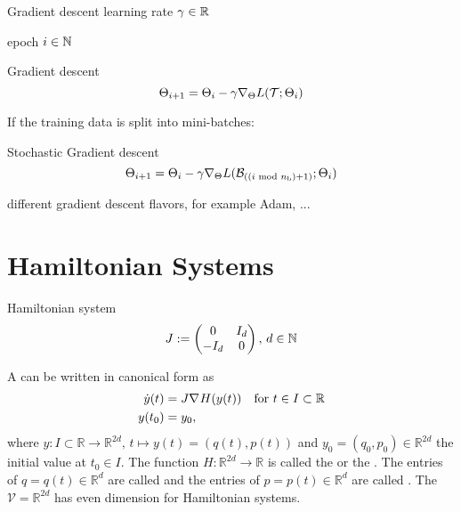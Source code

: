 \begin{frame}{Gradient descent}
  learning rate $\gamma \in  \R$

  epoch $i \in \N$
  \begin{block}{Gradient descent}
    \begin{equation*}
      \Theta_{i+1} = \Theta_i - \gamma \grad[\Theta]{L(\mathcal{T};\Theta_{i})}
    \end{equation*}
  \end{block}

  If the training data is split into mini-batches:
  \begin{block}{Stochastic Gradient descent}
    \begin{equation*}
      \Theta_{i+1} = \Theta_i - \gamma \grad[\Theta]{L(
        \mathcal{B}_{((i \textrm{ mod } n_{\text{b}}) + 1)};
        \Theta_{i})}
    \end{equation*}
  \end{block}

  different gradient descent flavors, for example Adam, ...
\end{frame}

\section{Hamiltonian Systems}

\begin{frame}{Hamiltonian system}
  \begin{equation*}
    J := \begin{pmatrix}
      0 & I_d \\
      -I_d & 0
    \end{pmatrix}, \,
    d \in \N
  \end{equation*}

  \begin{definition}
    A  can be written in canonical form as
    \begin{align*}
      \dot{y}(t) &= J \grad{H}(y(t)) \quad \text{for } t \in I \subset \mathbb{R} \\
      y(t_0) &= y_0
      ,
    \end{align*}
    where $y: I \subset \mathbb{R} \to \mathbb{R}^{2d},\, t \mapsto y(t) = (q(t),p(t))$ and 
    $y_0 = (q_0, p_0) \in \mathbb{R}^{2d}$ the initial value at $t_0 \in I$.
    The function $H: \mathbb{R}^{2d} \to \mathbb{R}$ is called the 
    or the . The entries of $q = q(t) \in \mathbb{R}^d$ are called 
    and the entries of $p=p(t) \in \mathbb{R}^d$ are called . 
    The  $\mathcal{V} = \mathbb{R}^{2d}$ has even dimension for Hamiltonian systems.
  \end{definition}
\end{frame}

